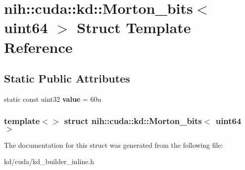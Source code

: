 \hypertarget{structnih_1_1cuda_1_1kd_1_1_morton__bits_3_01uint64_01_4}{
\section{nih\-:\-:cuda\-:\-:kd\-:\-:\-Morton\-\_\-bits$<$ uint64 $>$ \-Struct \-Template \-Reference}
\label{structnih_1_1cuda_1_1kd_1_1_morton__bits_3_01uint64_01_4}
}
\subsection*{\-Static \-Public \-Attributes}
\begin{DoxyCompactItemize}
\item 
\hypertarget{structnih_1_1cuda_1_1kd_1_1_morton__bits_3_01uint64_01_4_a6c7df017442ec582a8ba055ec5cd18ff}{
static const uint32 {\bfseries value} = 60u}
\label{structnih_1_1cuda_1_1kd_1_1_morton__bits_3_01uint64_01_4_a6c7df017442ec582a8ba055ec5cd18ff}

\end{DoxyCompactItemize}
\subsubsection*{template$<$$>$ struct nih\-::cuda\-::kd\-::\-Morton\-\_\-bits$<$ uint64 $>$}



\-The documentation for this struct was generated from the following file\-:\begin{DoxyCompactItemize}
\item 
kd/cuda/kd\-\_\-builder\-\_\-inline.\-h\end{DoxyCompactItemize}
